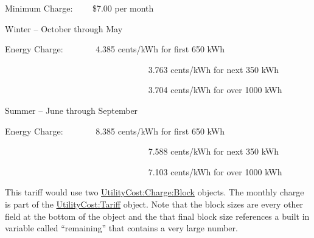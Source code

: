 Minimum Charge:~~~~ \$7.00 per month

Winter -- October through May

Energy Charge:~~~~~~~ 4.385 cents/kWh for first 650 kWh

~~~~~~~~~~~~~~~~~~~~~~~~~~~~~~~~~ 3.763 cents/kWh for next 350 kWh

~~~~~~~~~~~~~~~~~~~~~~~~~~~~~~~~~ 3.704 cents/kWh for over 1000 kWh

Summer -- June through September

Energy Charge:~~~~~~~ 8.385 cents/kWh for first 650 kWh

~~~~~~~~~~~~~~~~~~~~~~~~~~~~~~~~~ 7.588 cents/kWh for next 350 kWh

~~~~~~~~~~~~~~~~~~~~~~~~~~~~~~~~~ 7.103 cents/kWh for over 1000 kWh

This tariff would use two \hyperref[utilitycostchargeblock]{UtilityCost:Charge:Block} objects. The monthly charge is part of the \hyperref[utilitycosttariff]{UtilityCost:Tariff} object. Note that the block sizes are every other field at the bottom of the object and the that final block size references a built in variable called ``remaining'' that contains a very large number.

